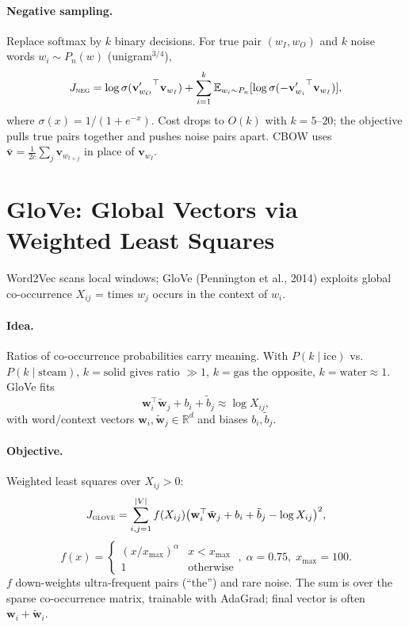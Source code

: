 \paragraph{Negative sampling.} Replace softmax by $k$ binary decisions. For
true pair $(w_{I},w_{O})$ and $k$ noise words $w_{i}\sim P_{n}(w)$
(unigram$^{3/4}$),
\begin{equation}
  J_{\textsc{neg}}=\log\sigma({\mathbf{v}'_{w_{O}}}^{\top}\mathbf{v}_{w_{I}})
  +\sum_{i=1}^{k}\mathbb{E}_{w_{i}\sim P_{n}}[\log\sigma(-{\mathbf{v}'_{w_{i}}}^{\top}\mathbf{v}_{w_{I}})],
  \label{eq:neg-sampling}
\end{equation}
where $\sigma(x)=1/(1+e^{-x})$. Cost drops to $O(k)$ with $k=5$--$20$; the
objective pulls true pairs together and pushes noise pairs apart. CBOW uses
$\bar{\mathbf{v}}=\frac1{2c}\sum_{j}\mathbf{v}_{w_{t+j}}$ in place of
$\mathbf{v}_{w_{I}}$.
\section{GloVe: Global Vectors via Weighted Least Squares}
\label{sec:glove}
Word2Vec scans local windows; GloVe (Pennington et al., 2014) exploits global
co-occurrence $X_{ij}$ = times $w_{j}$ occurs in the context of $w_{i}$.
\paragraph{Idea.} Ratios of co-occurrence probabilities carry meaning. With
$P(k\mid\text{ice})$ vs.\ $P(k\mid\text{steam})$, $k=\text{solid}$ gives ratio
$\gg1$, $k=\text{gas}$ the opposite, $k=\text{water}\approx1$. GloVe fits
\begin{equation}
  \mathbf{w}_{i}^{\top}\tilde{\mathbf{w}}_{j}+b_{i}+\tilde b_{j}\approx\log X_{ij},
\end{equation}
with word/context vectors $\mathbf{w}_{i},\tilde{\mathbf{w}}_{j}\in\mathbb{R}^{d}$
and biases $b_{i},\tilde b_{j}$.
\paragraph{Objective.} Weighted least squares over $X_{ij}>0$:
\begin{equation}
  J_{\textsc{glove}}=\sum_{i,j=1}^{|V|} f(X_{ij})
  \bigl(\mathbf{w}_{i}^{\top}\tilde{\mathbf{w}}_{j}+b_{i}+\tilde b_{j}-\log X_{ij}\bigr)^{2},
  \label{eq:glove}
\end{equation}
\begin{equation}
  f(x)=\begin{cases}(x/x_{\max})^{\alpha}&x<x_{\max}\\1&\text{otherwise}\end{cases}
  \!\!\!,\;\alpha=0.75,\;x_{\max}=100.
\end{equation}
$f$ down-weights ultra-frequent pairs (``the'') and rare noise. The sum is
over the sparse co-occurrence matrix, trainable with AdaGrad; final vector is
often $\mathbf{w}_{i}+\tilde{\mathbf{w}}_{i}$.
